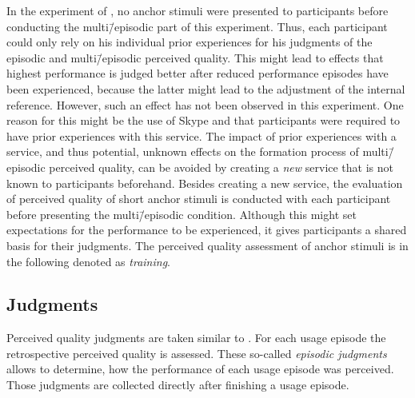 In the experiment of \citet{moller_single-call_2011}, no anchor stimuli were presented to participants before conducting the multi\=/episodic part of this experiment.
Thus, each participant could only rely on his individual prior experiences for his judgments of the episodic and multi\=/episodic perceived quality.
This might lead to effects that highest performance is judged better after reduced performance episodes have been experienced, because the latter might lead to the adjustment of the internal reference.
However, such an effect has not been observed in this experiment.
One reason for this might be the use of Skype and that participants were required to have prior experiences with this service.
The impact of prior experiences with a service, and thus potential, unknown effects on the formation process of multi\=/episodic perceived quality, can be avoided by creating a \emph{new} service that is not known to participants beforehand.
Besides creating a new service, the evaluation of perceived quality of short anchor stimuli is conducted with each participant before presenting the multi\=/episodic condition.
Although this might set expectations for the performance to be experienced, it gives participants a shared basis for their judgments.
The perceived quality assessment of anchor stimuli is in the following denoted as \emph{training}.


\subsection{Judgments}
Perceived quality judgments are taken similar to \citet{moller_single-call_2011}.
For each usage episode the retrospective perceived quality is assessed.
These so-called \emph{episodic judgments} allows to determine, how the performance of each usage episode was perceived.
Those judgments are collected directly after finishing a usage episode.

